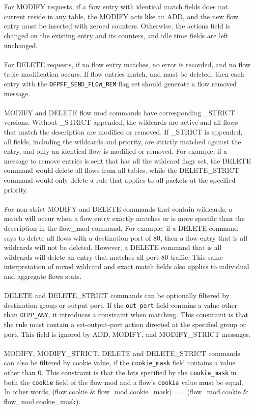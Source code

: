 \documentclass[10pt]{article}
\begin{document}
\\\\
For MODIFY requests, if a flow entry with identical match fields does not current reside in any table, the MODIFY acts like an ADD, and the new flow entry must be inserted with zeroed counters.  Otherwise, the actions field is changed on the existing entry and its counters, and idle time fields are left unchanged.
\\\\
For DELETE requests, if no flow entry matches, no error is recorded, and no flow table modification occurs.  If flow entries match, and must be deleted, then each entry with the \verb|OFPFF_SEND_FLOW_REM| flag set should generate a flow removed message.
\\\\
MODIFY and DELETE flow mod commands have corresponding \_STRICT versions.   Without \_STRICT appended, the wildcards are active and all flows that match the description are modified or removed.  If \_STRICT is appended, all fields, including the wildcards and priority, are strictly matched against the entry, and only an identical flow is modified or removed.  For example, if a message to remove entries is sent that has all the wildcard flags set, the DELETE command would delete all flows from all tables, while the DELETE\_STRICT command would only delete a rule that applies to all packets at the specified priority.
\\\\
For non-strict MODIFY and DELETE commands that contain wildcards, a match will occur when a flow entry exactly matches or is more specific than the description in the flow\_mod command. For example, if a DELETE command says to delete all flows with a destination port of 80, then a flow entry that is all wildcards will not be deleted. However, a DELETE command that is all wildcards will delete an entry that matches all port 80 traffic.  This same interpretation of mixed wildcard and exact match fields also applies to individual and aggregate flows stats.  
\\\\
DELETE and DELETE\_STRICT commands can be optionally filtered by destination group or output port.  If the \verb|out_port| field contains a value other than \verb|OFPP_ANY|, it introduces a constraint when matching.  This constraint is that the rule must contain a set-output-port action directed at the specified group or port.  This field is ignored by ADD, MODIFY, and MODIFY\_STRICT messages.
\\\\
MODIFY, MODIFY\_STRICT, DELETE and DELETE\_STRICT commands can also be filtered by cookie value, if the \verb|cookie_mask| field contains a value other than 0. This constraint is that the bits specified by the \verb|cookie_mask| in both the \verb|cookie| field of the flow mod and a flow's \verb|cookie| value must be equal. In other words, (flow.cookie \& flow\_mod.cookie\_mask) == (flow\_mod.cookie \& flow\_mod.cookie\_mask).
\end{document}
